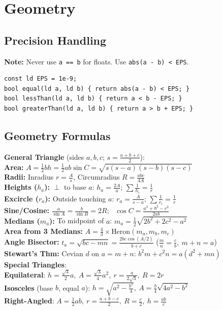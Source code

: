 \section{Geometry}
\subsection{Precision Handling}
\textbf{Note:} Never use \texttt{a == b} for floats. Use \texttt{abs(a - b) < EPS}.
\begin{verbatim}
const ld EPS = 1e-9;
bool equal(ld a, ld b) { return abs(a - b) < EPS; }
bool lessThan(ld a, ld b) { return a < b - EPS; }
bool greaterThan(ld a, ld b) { return a > b + EPS; }
\end{verbatim}
\subsection{Geometry Formulas}
\textbf{General Triangle} (sides $a, b, c$; $s = \frac{a+b+c}{2}$): \\
\textbullet{} \textbf{Area:} $A = \frac{1}{2}bh = \frac{1}{2}ab\sin C = \sqrt{s(s-a)(s-b)(s-c)}$ \\
\textbullet{} \textbf{Radii:} Inradius $r = \frac{A}{s}$, \quad Circumradius $R = \frac{abc}{4A}$ \\
\textbullet{} \textbf{Heights ($h_a$):} $\perp$ to base $a$: $h_a = \frac{2A}{a}$; \quad $\sum \frac{1}{h_i} = \frac{1}{r}$ \\
\textbullet{} \textbf{Excircle ($r_a$):} Outside touching $a$: $r_a = \frac{A}{s-a}$; \quad $\sum \frac{1}{r_i} = \frac{1}{r}$ \\
\textbullet{} \textbf{Sine/Cosine:} $\frac{a}{\sin A} = \frac{b}{\sin B} = 2R$; \ $\cos C = \frac{a^2+b^2-c^2}{2ab}$ \\
\textbullet{} \textbf{Medians ($m_a$):} To midpoint of $a$: $m_a = \frac{1}{2}\sqrt{2b^2+2c^2-a^2}$ \\
\textbullet{} \textbf{Area from 3 Medians:} $A = \frac{4}{3} \times \text{Heron}(m_a, m_b, m_c)$ \\
\textbullet{} \textbf{Angle Bisector:} $t_a = \sqrt{bc - mn} = \frac{2bc\cos(A/2)}{b+c}$ ($\frac{m}{n} = \frac{c}{b}, \ m+n=a$) \\
\textbullet{} \textbf{Stewart's Thm:} Cevian $d$ on $a = m+n$: $b^2 m + c^2 n = a(d^2 + mn)$ \\
\textbf{Special Triangles}: \\
\textbullet{} \textbf{Equilateral}: $h = \frac{\sqrt{3}}{2}a, \ A = \frac{\sqrt{3}}{4}a^2, \ r = \frac{a}{2\sqrt{3}}, \ R = 2r$ \\
\textbullet{} \textbf{Isosceles} (base $b$, equal $a$): $h = \sqrt{a^2 - \frac{b^2}{4}}, \ A = \frac{b}{4}\sqrt{4a^2-b^2}$ \\
\textbullet{} \textbf{Right-Angled}: $A = \frac{1}{2}ab, \ r = \frac{a+b-c}{2}, \ R = \frac{c}{2}, \ h = \frac{ab}{c}$ \\

